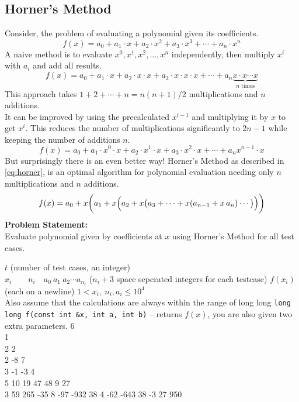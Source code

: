 \subsection{Horner's Method}
{\small Consider, the problem of evaluating a polynomial given its coefficients.
\begin{equation*}
	f(x)=a_{0}+a_{1}\cdot x+a_{2}\cdot x^{2}+a_{3}\cdot x^{3}+\cdots +a_{n}\cdot x^{n}
\end{equation*}
A naive method is to evaluate $x^0, x^1, x^2, \ldots, x^n$ independently, then multiply $x^i$ with $a_i$ and add all results.
\begin{equation*}
	f(x)=a_{0}+a_{1}\cdot x+a_{2}\cdot x\cdot x+a_{3}\cdot x\cdot x\cdot x+\cdots +a_{n}\underbrace{x\cdot x\cdots x}_{n\text{ times}}
\end{equation*}
This approach takes $1+2+\cdots+n=n(n+1)/2$ multiplications and $n$ additions.\\
It can be improved by using the precalculated $x^{i-1}$ and multiplying it by $x$ to get $x^{i}$. This reduces the number of multiplications significantly to $2n-1$ while keeping the number of additions $n$.
\begin{equation*}
	f(x)=a_{0}+a_{1}\cdot x^0\cdot x+a_{2}\cdot x^1\cdot x+a_{3}\cdot x^2\cdot x+\cdots +a_{n}x^{n-1}\cdot x
\end{equation*}
But surprisingly there is an even better way! Horner's Method as described in \ref{eq:horner}, is an optimal algorithm for polynomial evaluation needing only $n$ multiplications and $n$ additions.
\begin{equation}{\label{eq:horner}}
	f(x)=a_{0}+x\bigg(a_{1}+x\Big(a_{2}+x\big(a_{3}+\cdots +x(a_{n-1}+x\,a_{n})\cdots \big)\Big)\bigg)
\end{equation}
\textbf{Problem Statement:}\\
Evaluate polynomial given by coefficients at $x$ using Horner's Method for all test cases.
\begin{testcasesFunction}
	{$t$ \hfill(number of test cases, an integer)\\
	$x_i\qquad n_i \quad a_0\ a_1\ a_2 \cdots a_{n_i}$ \hfill($n_i+3$ space seperated integers for each testcase)}
	{$f(x_i)$\hfill(each on a newline)}
	{$1 < x_i,\ n_i, a_i \leq 10^{4}$\\
	Also assume that the calculations are always within the range of long long}
	{\texttt{long long f(const int \&x, int a, int b)} -- returns $f(x)$, you are also given two extra parameters.}
	{6\\1\\2 2\\2 -8 7\\3 -1 -3 4\\5 10 19 47 48 9 27\\3 59 265 -35 8 -97 -932 38 4 -62 -643 38 -3 27 950}

\end{testcasesFunction}}
